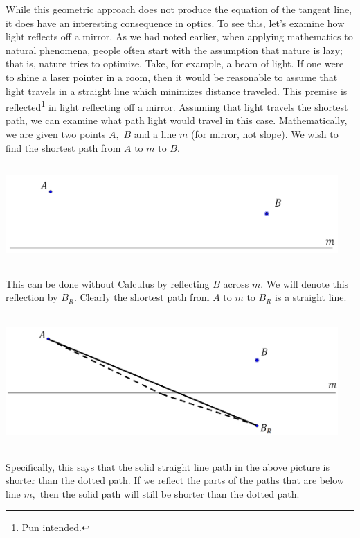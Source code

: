 While this geometric approach does not produce the equation of the
tangent line, it does have an interesting consequence in optics.  To
see this, let's examine how light reflects off a mirror.  As we had
noted earlier, when applying mathematics to natural phenomena, people
often start with the assumption that nature is lazy; that is, nature
tries to optimize.  Take, for example, a beam of light.  If one were
to shine a laser pointer in a room, then it would be reasonable to
assume that light travels in a straight line which minimizes distance
traveled.  This premise is reflected\footnote{Pun intended.}  in light
reflecting off a mirror.  Assuming that light travels the shortest
path, we can examine what path light would travel in this case.
Mathematically, we are given two points $A,$ $B$ and a line $m$ (for
mirror, not slope).  We wish to find the shortest path from $A$ to $m$
to $B.$

\centerline{\includegraphics*[height=1.5in,width=5in]{Figures/ReflectingMirror1}}

This can be done without Calculus by reflecting $B$ across $m.$  We will
denote this reflection by $B_R.$  Clearly the shortest path from $A$ to $m$
to $B_R$ is a straight line.

\centerline{\includegraphics*[height=2in,width=5in]{Figures/ReflectingMirror2}}

Specifically, this says that the solid straight line path in the above
picture is shorter than the dotted path.  If we reflect the parts of
the paths that are below line $m,$ then the solid path will still be
shorter than the dotted path.

